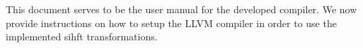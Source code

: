 \documentclass[12pt]{report}
\begin{document}
This document serves to be the user manual for the developed compiler. We now provide instructions on how to setup the
LLVM compiler in order to use the implemented \ac{sihft} transformations.

\newpage


\newpage




\end{document}
